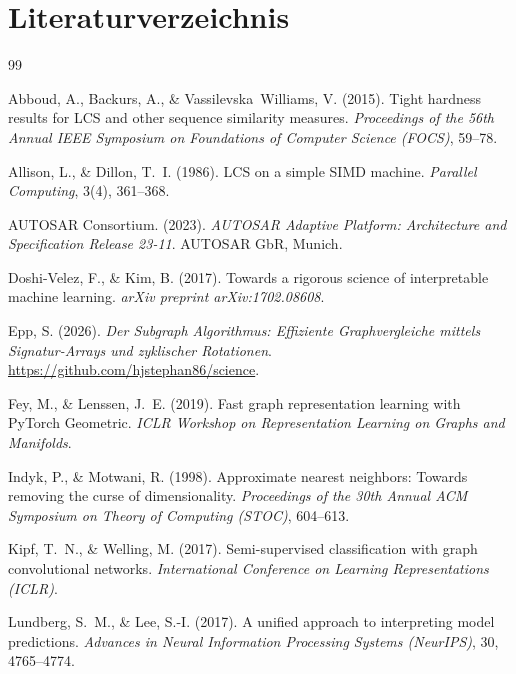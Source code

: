 ﻿\documentclass[a4paper,12pt]{article}
\theoremstyle{definition}
\begin{document}
\section*{Literaturverzeichnis}

\begin{thebibliography}{99}

Abboud, A., Backurs, A., \& Vassilevska~Williams, V. (2015).
Tight hardness results for LCS and other sequence similarity measures.
\emph{Proceedings of the 56th Annual IEEE Symposium on Foundations of
Computer Science (FOCS)}, 59--78.

Allison, L., \& Dillon, T.~I. (1986).
LCS on a simple SIMD machine.
\emph{Parallel Computing}, 3(4), 361--368.

AUTOSAR Consortium. (2023).
\emph{AUTOSAR Adaptive Platform: Architecture and Specification Release 23-11}.
AUTOSAR GbR, Munich.

Doshi-Velez, F., \& Kim, B. (2017).
Towards a rigorous science of interpretable machine learning.
\emph{arXiv preprint arXiv:1702.08608}.

Epp, S. (2026).
\emph{Der Subgraph Algorithmus: Effiziente Graphvergleiche mittels Signatur-Arrays
und zyklischer Rotationen}.
\url{https://github.com/hjstephan86/science}.

Fey, M., \& Lenssen, J.~E. (2019).
Fast graph representation learning with PyTorch Geometric.
\emph{ICLR Workshop on Representation Learning on Graphs and Manifolds}.

Indyk, P., \& Motwani, R. (1998).
Approximate nearest neighbors: Towards removing the curse of dimensionality.
\emph{Proceedings of the 30th Annual ACM Symposium on Theory of Computing (STOC)},
604--613.

Kipf, T.~N., \& Welling, M. (2017).
Semi-supervised classification with graph convolutional networks.
\emph{International Conference on Learning Representations (ICLR)}.

Lundberg, S.~M., \& Lee, S.-I. (2017).
A unified approach to interpreting model predictions.
\emph{Advances in Neural Information Processing Systems (NeurIPS)}, 30, 4765--4774.


\end{thebibliography}
\end{document}

